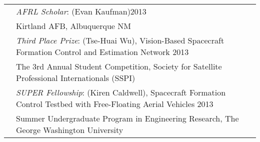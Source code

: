 \documentclass[10pt]{article}
\begin{document}
\begin{tabularx}{\textwidth}{>{\setlength{\hsize}{0.5cm}}X X}
& \textit{AFRL Scholar}: (Evan Kaufman)\hfill 2013\\
& Kirtland AFB, Albuquerque NM\\[0.2cm]

& \textit{Third Place Prize}: (Tse-Huai Wu), {Vision-Based Spacecraft Formation Control and Estimation Network} \hfill 2013\\
& The 3rd Annual Student Competition, Society for Satellite Professional Internationals (SSPI)\\[0.2cm]

& \textit{SUPER Fellowship}: (Kiren Caldwell), {Spacecraft Formation Control Testbed
with Free-Floating Aerial Vehicles} \hfill 2013\\
& Summer Undergraduate Program in Engineering Research, The George Washington University\vspace*{0.08cm}\\
\end{tabularx}


\vspace*{0.2cm}

\setlength{\tabcolsep}{0cm}
\end{document}
